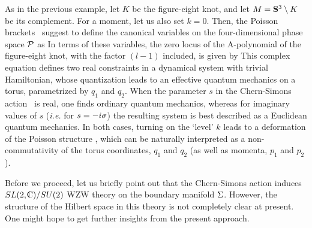 As in the previous example, let $K$ be the figure-eight knot,
and let $M=\S^3 \setminus K$ be its complement.
For a moment, let us also set $k=0$.
Then, the Poisson brackets \uvkspb\ suggest to define
the canonical variables on the four-dimensional
phase space $\CP$ as
%
\eqn{}
%
In terms of these variables, the zero locus of the A-polynomial
of the figure-eight knot, with the factor $(l-1)$ included, is given by
%
\eqn{}
%
This complex equation defines two real constraints in a dynamical
system with trivial Hamiltonian,
whose quantization leads to an effective quantum mechanics
on a torus, parametrized by $q_1$ and $q_2$.
When the parameter $s$ in the Chern-Simons action \iaction\ is real,
one finds ordinary quantum mechanics, whereas for imaginary values
of $s$ ({\it i.e.} for $s=-i \s$) the resulting system
is best described as a Euclidean quantum mechanics.
In both cases, turning on the `level' $k$ leads to
a deformation of the Poisson structure \uvkspb,
which can be naturally interpreted as a non-commutativity
of the torus coordinates, $q_1$ and $q_2$
(as well as momenta, $p_1$ and $p_2$).

\endexample

Before we proceed, let us briefly point out that
the Chern-Simons action induces $SL(2,\IC)/SU(2)$ WZW theory
on the boundary manifold $\Si$.
However, the structure of the Hilbert space in
this theory is not completely clear at present.
One might hope to get further insights from
the present approach.


